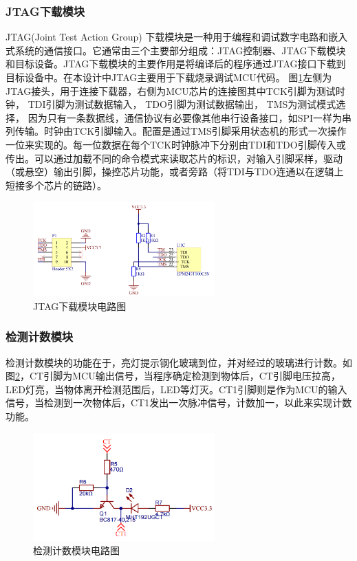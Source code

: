 \subsubsection{JTAG下载模块}
JTAG(Joint Test Action Group) 下载模块是一种用于编程和调试数字电路和嵌入式系统的通信接口。它通常由三个主要部分组成：JTAG控制器、JTAG下载模块和目标设备。JTAG下载模块的主要作用是将编译后的程序通过JTAG接口下载到目标设备中。在本设计中JTAG主要用于下载烧录调试MCU代码。
图\ref{JTAG下载模块电路图}左侧为JTAG接头，用于连接下载器，右侧为MCU芯片的连接图其中TCK引脚为测试时钟，
TDI引脚为测试数据输入，
TDO引脚为测试数据输出，
TMS为测试模式选择，
因为只有一条数据线，通信协议有必要像其他串行设备接口，如SPI一样为串列传输。时钟由TCK引脚输入。配置是通过TMS引脚采用状态机的形式一次操作一位来实现的。每一位数据在每个TCK时钟脉冲下分别由TDI和TDO引脚传入或传出。可以通过加载不同的命令模式来读取芯片的标识，对输入引脚采样，驱动（或悬空）输出引脚，操控芯片功能，或者旁路（将TDI与TDO连通以在逻辑上短接多个芯片的链路）。
\begin{figure}[ht]
	\centering
	\includegraphics[width=7cm]{figure/JTAG download circuit.png}
	\caption{JTAG下载模块电路图}
	\label{JTAG下载模块电路图}
\end{figure}

\subsubsection{检测计数模块}
检测计数模块的功能在于，亮灯提示钢化玻璃到位，并对经过的玻璃进行计数。如图\ref{检测计数模块电路图}，CT引脚为MCU输出信号，当程序确定检测到物体后，CT引脚电压拉高，LED灯亮，当物体离开检测范围后，LED等灯灭。CT1引脚则是作为MCU的输入信号，当检测到一次物体后，CT1发出一次脉冲信号，计数加一，以此来实现计数功能。
\begin{figure}[ht]
	\centering
	\includegraphics[width=7cm]{figure/detection count circuit.png}
	\caption{检测计数模块电路图}
	\label{检测计数模块电路图}
\end{figure}
\newpage
